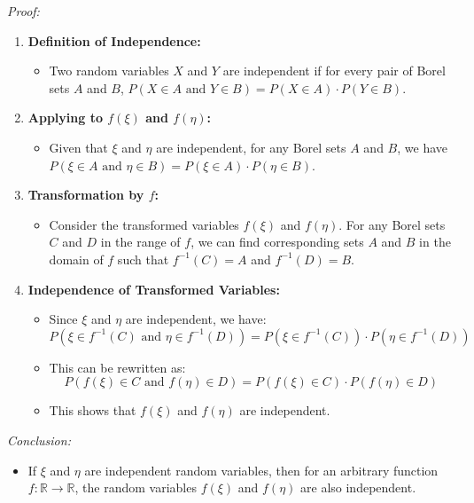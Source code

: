 \textit{Proof:}
\begin{enumerate}
    \item \textbf{Definition of Independence:}
          \begin{itemize}
              \item Two random variables \(X\) and \(Y\) are independent if for every pair of Borel sets \(A\) and \(B\), \(P(X \in A \text{ and } Y \in B) = P(X \in A) \cdot P(Y \in B)\).
          \end{itemize}

    \item \textbf{Applying to \(f(\xi)\) and \(f(\eta)\):}
          \begin{itemize}
              \item Given that \(\xi\) and \(\eta\) are independent, for any Borel sets \(A\) and \(B\), we have \(P(\xi \in A \text{ and } \eta \in B) = P(\xi \in A) \cdot P(\eta \in B)\).
          \end{itemize}

    \item \textbf{Transformation by \(f\):}
          \begin{itemize}
              \item Consider the transformed variables \(f(\xi)\) and \(f(\eta)\). For any Borel sets \(C\) and \(D\) in the range of \(f\), we can find corresponding sets \(A\) and \(B\) in the domain of \(f\) such that \(f^{-1}(C) = A\) and \(f^{-1}(D) = B\).
          \end{itemize}

    \item \textbf{Independence of Transformed Variables:}
          \begin{itemize}
              \item Since \(\xi\) and \(\eta\) are independent, we have:
                    \[ P(\xi \in f^{-1}(C) \text{ and } \eta \in f^{-1}(D)) = P(\xi \in f^{-1}(C)) \cdot P(\eta \in f^{-1}(D)) \]
              \item This can be rewritten as:
                    \[ P(f(\xi) \in C \text{ and } f(\eta) \in D) = P(f(\xi) \in C) \cdot P(f(\eta) \in D) \]
              \item This shows that \(f(\xi)\) and \(f(\eta)\) are independent.
          \end{itemize}
\end{enumerate}

\textit{Conclusion:}
\begin{itemize}
    \item If \(\xi\) and \(\eta\) are independent random variables, then for an arbitrary function \(f : \mathbb{R} \rightarrow \mathbb{R}\), the random variables \(f(\xi)\) and \(f(\eta)\) are also independent.
\end{itemize}


